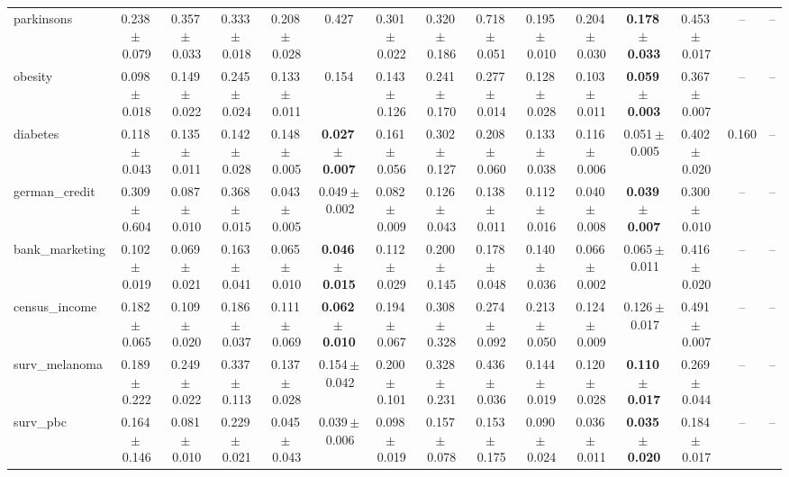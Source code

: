 \documentclass[8pt]{extarticle}
\begin{document}
\begin{longtable}{l*{14}{c}}
parkinsons & 0.238\,$\pm$\,0.079 & 0.357\,$\pm$\,0.033 & 0.333\,$\pm$\,0.018 & 0.208\,$\pm$\,0.028 & 0.427 & 0.301\,$\pm$\,0.022 & 0.320\,$\pm$\,0.186 & 0.718\,$\pm$\,0.051 & 0.195\,$\pm$\,0.010 & 0.204\,$\pm$\,0.030 & \textbf{0.178\,$\pm$\,0.033} & 0.453\,$\pm$\,0.017 & -- & -- \\
obesity & 0.098\,$\pm$\,0.018 & 0.149\,$\pm$\,0.022 & 0.245\,$\pm$\,0.024 & 0.133\,$\pm$\,0.011 & 0.154 & 0.143\,$\pm$\,0.126 & 0.241\,$\pm$\,0.170 & 0.277\,$\pm$\,0.014 & 0.128\,$\pm$\,0.028 & 0.103\,$\pm$\,0.011 & \textbf{0.059\,$\pm$\,0.003} & 0.367\,$\pm$\,0.007 & -- & -- \\
diabetes & 0.118\,$\pm$\,0.043 & 0.135\,$\pm$\,0.011 & 0.142\,$\pm$\,0.028 & 0.148\,$\pm$\,0.005 & \textbf{0.027\,$\pm$\,0.007} & 0.161\,$\pm$\,0.056 & 0.302\,$\pm$\,0.127 & 0.208\,$\pm$\,0.060 & 0.133\,$\pm$\,0.038 & 0.116\,$\pm$\,0.006 & 0.051\,$\pm$\,0.005 & 0.402\,$\pm$\,0.020 & 0.160 & -- \\
german\_credit & 0.309\,$\pm$\,0.604 & 0.087\,$\pm$\,0.010 & 0.368\,$\pm$\,0.015 & 0.043\,$\pm$\,0.005 & 0.049\,$\pm$\,0.002 & 0.082\,$\pm$\,0.009 & 0.126\,$\pm$\,0.043 & 0.138\,$\pm$\,0.011 & 0.112\,$\pm$\,0.016 & 0.040\,$\pm$\,0.008 & \textbf{0.039\,$\pm$\,0.007} & 0.300\,$\pm$\,0.010 & -- & -- \\
bank\_marketing & 0.102\,$\pm$\,0.019 & 0.069\,$\pm$\,0.021 & 0.163\,$\pm$\,0.041 & 0.065\,$\pm$\,0.010 & \textbf{0.046\,$\pm$\,0.015} & 0.112\,$\pm$\,0.029 & 0.200\,$\pm$\,0.145 & 0.178\,$\pm$\,0.048 & 0.140\,$\pm$\,0.036 & 0.066\,$\pm$\,0.002 & 0.065\,$\pm$\,0.011 & 0.416\,$\pm$\,0.020 & -- & -- \\
census\_income & 0.182\,$\pm$\,0.065 & 0.109\,$\pm$\,0.020 & 0.186\,$\pm$\,0.037 & 0.111\,$\pm$\,0.069 & \textbf{0.062\,$\pm$\,0.010} & 0.194\,$\pm$\,0.067 & 0.308\,$\pm$\,0.328 & 0.274\,$\pm$\,0.092 & 0.213\,$\pm$\,0.050 & 0.124\,$\pm$\,0.009 & 0.126\,$\pm$\,0.017 & 0.491\,$\pm$\,0.007 & -- & -- \\
surv\_melanoma & 0.189\,$\pm$\,0.222 & 0.249\,$\pm$\,0.022 & 0.337\,$\pm$\,0.113 & 0.137\,$\pm$\,0.028 & 0.154\,$\pm$\,0.042 & 0.200\,$\pm$\,0.101 & 0.328\,$\pm$\,0.231 & 0.436\,$\pm$\,0.036 & 0.144\,$\pm$\,0.019 & 0.120\,$\pm$\,0.028 & \textbf{0.110\,$\pm$\,0.017} & 0.269\,$\pm$\,0.044 & -- & -- \\
surv\_pbc & 0.164\,$\pm$\,0.146 & 0.081\,$\pm$\,0.010 & 0.229\,$\pm$\,0.021 & 0.045\,$\pm$\,0.043 & 0.039\,$\pm$\,0.006 & 0.098\,$\pm$\,0.019 & 0.157\,$\pm$\,0.078 & 0.153\,$\pm$\,0.175 & 0.090\,$\pm$\,0.024 & 0.036\,$\pm$\,0.011 & \textbf{0.035\,$\pm$\,0.020} & 0.184\,$\pm$\,0.017 & -- & -- \\

\end{longtable}
\end{document}
